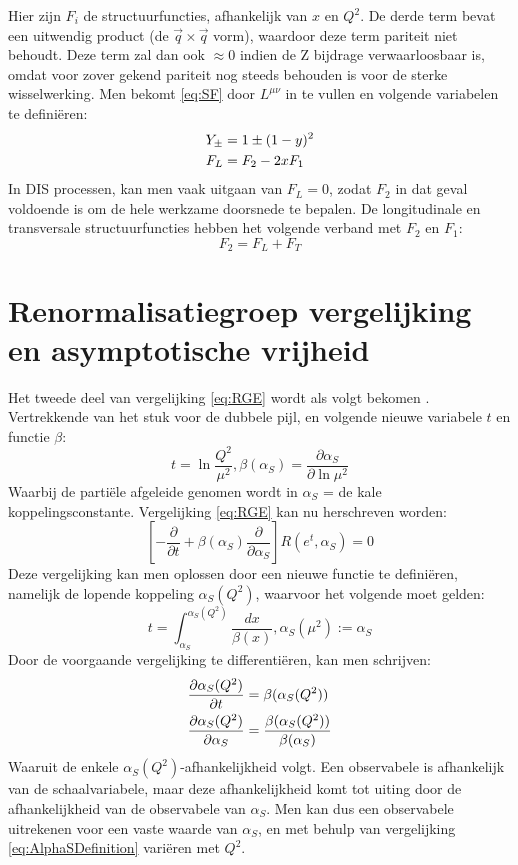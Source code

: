 \documentclass[a4paper,11pt]{article}
\numberwithin{equation}{section} %
\begin{document}
Hier zijn $F_i$ de structuurfuncties, afhankelijk van $x$ en $Q^2$.
De derde term bevat een uitwendig product (de $\vec{q} \times \vec{q}$ vorm), waardoor deze term pariteit niet behoudt.
Deze term zal dan ook $\approx 0$ indien de Z bijdrage verwaarloosbaar is, omdat voor zover gekend pariteit nog steeds behouden is voor de sterke wisselwerking.
Men bekomt \eqref{eq:SF} door $L^{\mu \nu}$ in te vullen en volgende variabelen te definiëren:
\begin{align}
Y_\pm &= 1 \pm (1-y)^2 \notag \\
F_L &= F_2 - 2x F_1 \notag
\end{align}
In DIS processen, kan men vaak uitgaan van $F_L = 0$, zodat $F_2$ in dat geval voldoende is om de hele werkzame doorsnede te bepalen.
De longitudinale en transversale structuurfuncties hebben het volgende verband met $F_2$ en $F_1$:
\begin{equation}
F_2 = F_L + F_T
\end{equation}

\section{Renormalisatiegroep vergelijking en asymptotische vrijheid} \label{app:RGE}
Het tweede deel van vergelijking \eqref{eq:RGE} wordt als volgt bekomen \cite{Ellis}.
Vertrekkende van het stuk voor de dubbele pijl, en volgende nieuwe variabele $t$ en functie $\beta$:
\begin{equation}
t = \ln{\frac{Q^2}{\mu^2}}, \beta(\alpha_S) =  \frac{\partial \alpha_S}{\partial \ln{\mu^2}}
\end{equation}
Waarbij de partiële afgeleide genomen wordt in $\alpha_S$ = de kale koppelingsconstante.
Vergelijking \eqref{eq:RGE} kan nu herschreven worden:
\begin{equation}
\left[ -\frac{\partial}{\partial t} + \beta(\alpha_S) \frac{\partial}{\partial \alpha_S} \right] R(e^t, \alpha_S) = 0
\end{equation}
Deze vergelijking kan men oplossen door een nieuwe functie te definiëren, namelijk de lopende koppeling $\alpha_S(Q^2)$, waarvoor het volgende moet gelden:
\begin{equation} \label{eq:AlphaSDefinition}
t = \int_{\alpha_S}^{\alpha_S(Q^2)} \frac{dx}{\beta(x)}, \alpha_S(\mu^2) := \alpha_S
\end{equation}
Door de voorgaande vergelijking te differentiëren, kan men schrijven:
\begin{align}
\frac{\partial \alpha_S(Q^2)}{\partial t} &= \beta( \alpha_S(Q^2) ) \notag \\ \frac{\partial \alpha_S(Q^2)}{\partial \alpha_S} &= \frac{\beta(\alpha_S(Q^2))}{\beta(\alpha_S)}
\end{align}
Waaruit de enkele $\alpha_S(Q^2)$-afhankelijkheid volgt.
Een observabele is afhankelijk van de schaalvariabele, maar deze afhankelijkheid komt tot uiting door de afhankelijkheid van de observabele van $\alpha_S$.
Men kan dus een observabele uitrekenen voor een vaste waarde van $\alpha_S$, en met behulp van vergelijking \eqref{eq:AlphaSDefinition} variëren met $Q^2$.
\end{document}
